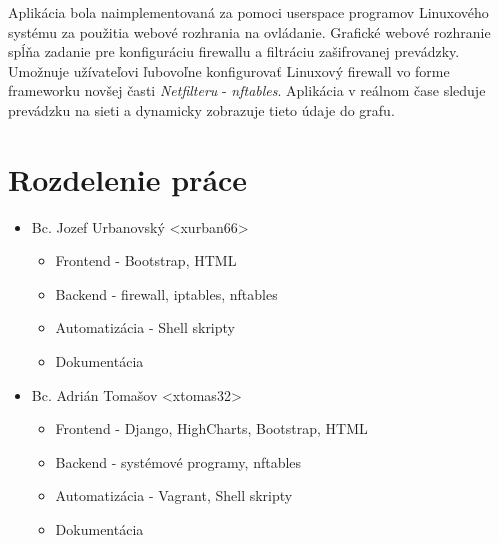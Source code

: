 Aplikácia bola naimplementovaná za pomoci userspace programov Linuxového systému za použitia webové rozhrania na ovládanie.
Grafické webové rozhranie spĺňa zadanie pre konfiguráciu firewallu a filtráciu zašifrovanej prevádzky. Umožnuje užívateľovi ľubovoľne konfigurovať Linuxový firewall vo forme frameworku novšej časti \emph{Netfilteru} - \emph{nftables}. Aplikácia v reálnom čase sleduje prevádzku na sieti a dynamicky zobrazuje tieto údaje do grafu. 

	\section{Rozdelenie práce}
	
	\begin{itemize}
		\item Bc. Jozef Urbanovský <xurban66>
		\begin{itemize}
			\item Frontend - Bootstrap, HTML
			\item Backend - firewall, iptables, nftables
			\item Automatizácia - Shell skripty
			\item Dokumentácia
		\end{itemize}
	
		\item Bc. Adrián Tomašov <xtomas32>
		\begin{itemize}
			\item Frontend - Django, HighCharts, Bootstrap, HTML
			\item Backend - systémové programy, nftables
			\item Automatizácia - Vagrant, Shell skripty
			\item Dokumentácia
		\end{itemize}
		
	\end{itemize}
	

